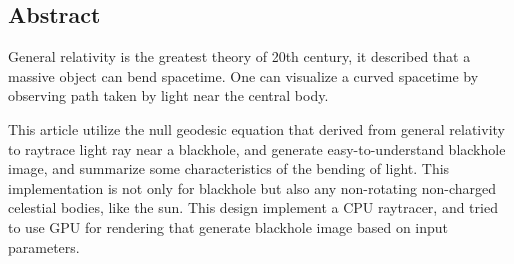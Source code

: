 \begin{spacing}{0.95}
  \centering
  \heiti{}\textbf{\thesisTitleEN}
\end{spacing}

\vspace*{17mm}

\begin{center}
{\let\clearpage\relax \chapter*{
  \textbf{Abstract}\vskip -3bp}}
\end{center}

\setcounter{page}{2}

\setlength{\parskip}{0em}

General relativity is the greatest theory of 20th century, it described that a massive object can bend spacetime. One can visualize a curved spacetime by observing path taken by light near the central body.

This article utilize the null geodesic equation that derived from general relativity to raytrace light ray near a blackhole, and generate easy-to-understand blackhole image, and summarize some characteristics of the bending of light. This implementation is not only for blackhole but also any non-rotating non-charged celestial bodies, like the sun. This design implement a CPU raytracer, and tried to use GPU for rendering that generate blackhole image based on input parameters.


\vspace{3ex}
\newpage
